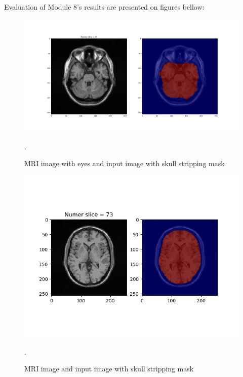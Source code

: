 Evaluation of Module 8's results are presented on figures bellow:
\begin{figure}[H]
\centering{}\includegraphics[scale=0.3]{figures/M8_Figure_1.png}\caption{MRI image with eyes and input image with skull stripping mask}.
\label{fig:figures/Module8_Figure_1}
\end{figure}
\begin{figure}[H]
\centering{}\includegraphics[scale=0.8]{figures/M8_Figure_1-3.png}\caption{MRI image and input image with skull stripping mask}.
\label{fig:figures/Module8_Figure_2}
\end{figure}
